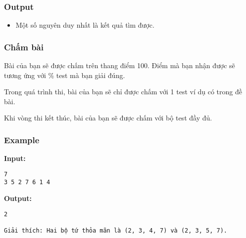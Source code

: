 \subsubsection{Output}
\begin{itemize}
	\item Một số nguyên duy nhất là kết quả tìm được.
\end{itemize}

\subsubsection{Chấm bài}

Bài của bạn sẽ được chấm trên thang điểm 100. Điểm mà bạn nhận được sẽ tương ứng với \% test mà bạn giải đúng.

Trong quá trình thi, bài của bạn sẽ chỉ được chấm với 1 test ví dụ có trong đề bài.

Khi vòng thi kết thúc, bài của bạn sẽ được chấm với bộ test đầy đủ.

\subsubsection{Example}

\textbf{Input: }
\begin{verbatim}
7
3 5 2 7 6 1 4\end{verbatim}

\textbf{Output: }
\begin{verbatim}
2

Giải thích: Hai bộ tứ thỏa mãn là (2, 3, 4, 7) và (2, 3, 5, 7).\end{verbatim}
